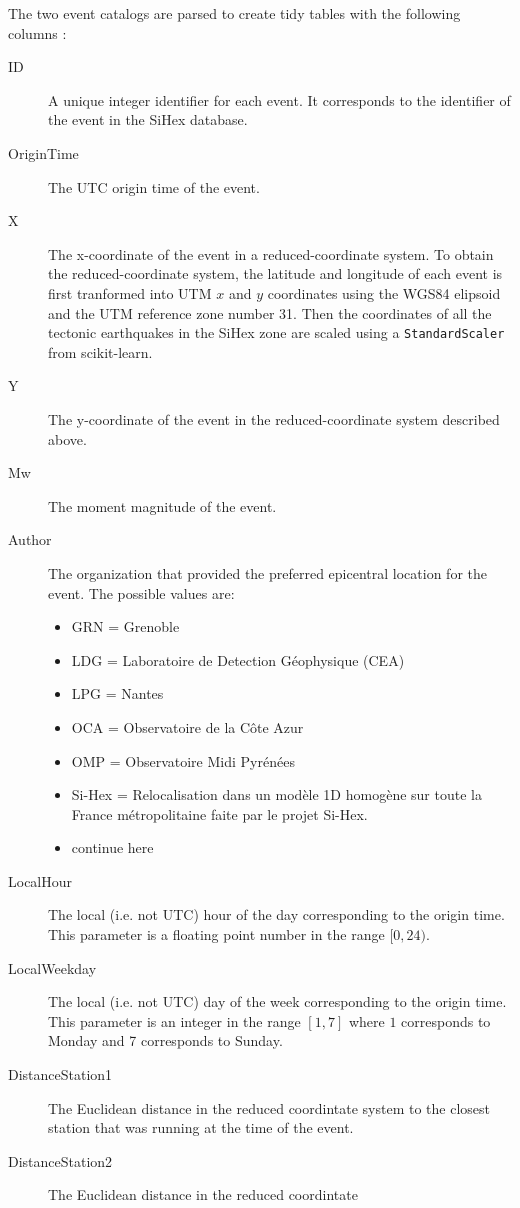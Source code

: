 The two event catalogs are parsed to create tidy tables with the following
columns :
\begin{description}
\item[ID] A unique integer identifier for each event. It corresponds to the
identifier of the event in the SiHex database.
\item[OriginTime] The UTC origin time of the event.
\item[X] The x-coordinate of the event in a reduced-coordinate system. To
obtain the reduced-coordinate system, the latitude and longitude of each event
is first tranformed into UTM $x$ and $y$ coordinates using the WGS84 elipsoid
and the UTM reference zone number 31. Then the coordinates of all the tectonic
earthquakes in the SiHex zone are scaled using a {\tt StandardScaler} from
{scikit-learn}.
\item[Y] The y-coordinate of the event in the reduced-coordinate system
described above.
\item[Mw] The moment magnitude of the event.
\item[Author] The organization that provided the preferred epicentral location
for the event. The possible values are:
\begin{itemize}
\item GRN = Grenoble
\item LDG = Laboratoire de Detection Géophysique (CEA)
\item LPG = Nantes
\item OCA = Observatoire de la Côte Azur
\item OMP = Observatoire Midi Pyrénées
\item Si-Hex = Relocalisation dans un modèle 1D homogène sur toute la France
métropolitaine faite par le projet Si-Hex.
\item continue here
\end{itemize}
\item[LocalHour] The local (i.e. not UTC) hour of the day corresponding to the
origin time. This parameter is a floating point number in the range $[0, 24)$.
\item[LocalWeekday] The local (i.e. not UTC) day of the week corresponding to
the origin time. This parameter is an integer in the range $[1, 7]$ where $1$
corresponds to Monday and 7 corresponds to Sunday.
\item[DistanceStation1] The Euclidean distance in the reduced coordintate
system to the closest station that was running at the time of the event. 
\item[DistanceStation2] The Euclidean distance in the reduced coordintate

\end{description}
